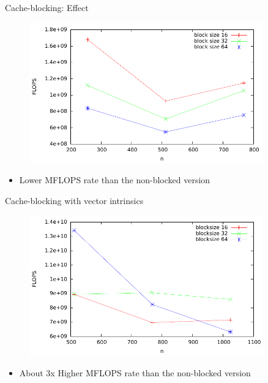 \begin{frame}{Cache-blocking: Effect}
\begin{figure}[h]
  \begin{center}
    \includegraphics[width=0.9\textwidth]{../graphics/graph_blocked_flops.pdf}
  \end{center}
\end{figure}
\begin{itemize}
\item Lower MFLOPS rate than the non-blocked version
\end{itemize}
\end{frame}

\begin{frame}{Cache-blocking with vector intrinsics}
\begin{figure}[h]
  \begin{center}
    \includegraphics[width=0.9\textwidth]{../graphics/graph_avx.pdf}
  \end{center}
\end{figure}
\begin{itemize}
\item About 3x Higher MFLOPS rate than the non-blocked version
\end{itemize}
\end{frame}
